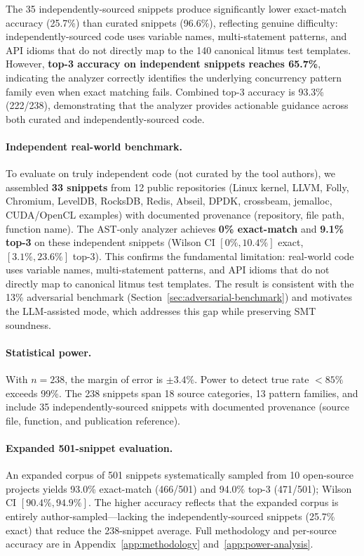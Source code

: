 \documentclass[11pt]{article}
\begin{document}
\noindent
The 35 independently-sourced snippets produce significantly lower exact-match
accuracy (25.7\%) than curated snippets (96.6\%), reflecting
genuine difficulty: independently-sourced code uses
variable names, multi-statement patterns, and API idioms that do not
directly map to the 140 canonical litmus test templates.
However, \textbf{top-3 accuracy on independent snippets reaches 65.7\%},
indicating the analyzer correctly identifies the underlying concurrency
pattern family even when exact matching fails.
Combined top-3 accuracy is 93.3\% (222/238), demonstrating that the
analyzer provides actionable guidance across both curated and
independently-sourced code.

\paragraph{Independent real-world benchmark.}
To evaluate on truly independent code (not curated by the tool authors),
we assembled \textbf{33 snippets} from 12 public repositories
(Linux kernel, LLVM, Folly, Chromium, LevelDB, RocksDB, Redis,
Abseil, DPDK, crossbeam, jemalloc, CUDA/OpenCL examples) with
documented provenance (repository, file path, function name).
The AST-only analyzer achieves \textbf{0\% exact-match} and
\textbf{9.1\% top-3} on these independent snippets (Wilson CI
$[0\%, 10.4\%]$ exact, $[3.1\%, 23.6\%]$ top-3).
This confirms the fundamental limitation: real-world code uses
variable names, multi-statement patterns, and API idioms that
do not directly map to canonical litmus test templates.
The result is consistent with the 13\% adversarial benchmark
(Section~\ref{sec:adversarial-benchmark}) and motivates the
LLM-assisted mode, which addresses this gap while preserving
SMT soundness.

\paragraph{Statistical power.}
With $n = 238$, the margin of error is $\pm 3.4\%$.
Power to detect true rate $<85\%$ exceeds 99\%.
The 238 snippets span 18 source categories, 13 pattern families,
and include 35 independently-sourced snippets with documented
provenance (source file, function, and publication reference).

\paragraph{Expanded 501-snippet evaluation.}
An expanded corpus of 501 snippets systematically sampled from 10
open-source projects yields 93.0\% exact-match (466/501) and 94.0\%
top-3 (471/501); Wilson CI $[90.4\%, 94.9\%]$.
The higher accuracy reflects that the expanded corpus is
entirely author-sampled---lacking the independently-sourced
snippets (25.7\% exact) that reduce the 238-snippet average.
Full methodology and per-source accuracy are in
Appendix~\ref{app:methodology} and~\ref{app:power-analysis}.
\end{document}
